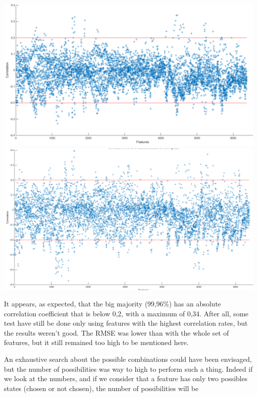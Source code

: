 \documentclass{report}
\begin{document}
	\vspace{0.5cm}
	\begin{center}
		\includegraphics[scale=0.35]{ressources/corr1}
		\vspace{1cm}
		\includegraphics[scale=0.28]{ressources/corr2}
	\end{center}
	\vspace{0.5cm}
	
	It appears, as expected, that the big majority (99,96\%) has an absolute correlation coefficient that is below 0,2, with a maximum of 0,34. After all, some test have still be done only using features with the highest correlation rates, but the results weren't good. The RMSE was lower than with the whole set of features, but it still remained too high to be mentioned here.
	
	An exhaustive search about the possible combinations could have been envisaged, but the number of possibilities was way to high to perform such a thing. Indeed if we look at the numbers, and if we consider that a feature has only two possibles states (chosen or not chosen), the number of possibilities will be
	
\end{document}
